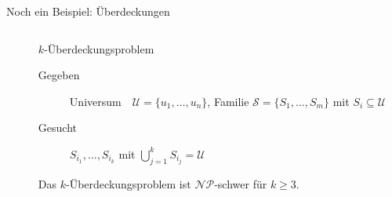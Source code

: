 \documentclass[table,german,10pt]{beamer}
\begin{document}
\begin{frame}{Noch ein Beispiel: Überdeckungen}
  \begin{columns}
    \begin{column}{5cm}
      \begin{center}
      \end{center}
    \end{column}
    \begin{column}{7cm}
      \begin{problem}{$k$-Überdeckungsproblem}
        \begin{description}
        \item[Gegeben] Universum\ \ $\mathcal{U}=\{u_{1},\ldots,u_{n}\}$,
          Familie $\mathcal{S}=\{S_{1},\ldots,S_{m}\}$ mit $S_{i}\subseteq
          \mathcal{U}$
        \item[Gesucht] $S_{i_{1}},\ldots,S_{i_{k}}$ mit $\bigcup_{j=1}^{k}S_{i_{j}}=\mathcal{U}$
        \end{description}
      \end{problem}
      \pause
      \begin{theorem}[Karp 1971]
        Das $k$-Überdeckungsproblem ist $\mathcal{NP}$-schwer für
        $k\geq 3$.
      \end{theorem}
    \end{column}
  \end{columns}
\end{frame}
\end{document}
